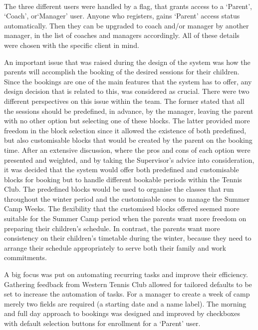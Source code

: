 \documentclass{l3proj}
\begin{document}
\\
\par 
The three different users were handled by a flag, that grants access to a `Parent', `Coach', or`Manager' user. Anyone who registers, gains `Parent' access status automatically. Then they can be upgraded to coach and/or manager by another manager, in the list of coaches and managers accordingly. All of these details were chosen with the specific client in mind.\\
\par An important issue that was raised during the design of the system was how the parents will accomplish the booking of the desired sessions for their children. Since the bookings are one of the main features that the system has to offer, any design decision that is related to this, was considered as crucial. There were two different perspectives on this issue within the team. The former stated that all the sessions should be predefined, in advance, by the manager, leaving the parent with no other option but selecting one of these blocks. The latter provided more freedom in the block selection since it allowed the existence of both predefined, but also customisable blocks that would be created by the parent on the booking time. After an extensive discussion, where the pros and cons of each option were presented and weighted, and by taking the  Supervisor's advice into consideration, it was decided that the system would offer both predefined and customisable blocks for booking but to handle different bookable periods within the Tennis Club. The predefined blocks would be used to organise the classes that run throughout the winter period and the customisable ones to manage the Summer Camp Weeks. The flexibility that the customised blocks offered seemed more suitable for the Summer Camp period when the parents want more freedom on preparing their children's schedule. In contrast, the parents want more consistency on their children's timetable during the winter, because they need to arrange their schedule appropriately to serve both their family and work commitments.\\
\par A big focus was put on automating recurring tasks and improve their efficiency. Gathering feedback from Western Tennis Club allowed for tailored defaults to be set to increase the automation of tasks. For a manager to create a week of camp merely two fields are required (a starting date and a name label). The morning and full day approach to bookings was designed and improved by checkboxes with default selection buttons for enrollment for a `Parent' user.\\
\end{document}

